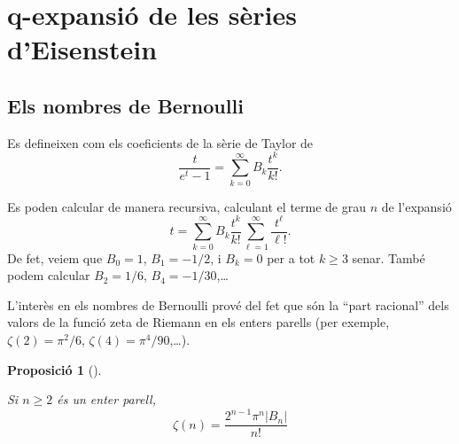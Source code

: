\documentclass[
  letterpaper,
  DIV=11,
  numbers=noendperiod]{scrreprt}
\theoremstyle{plain}
\theoremstyle{plain}
\theoremstyle{definition}
\theoremstyle{plain}
\newtheorem{proposition}{Proposició}[chapter]
\theoremstyle{plain}
\theoremstyle{definition}
\theoremstyle{remark}
\begin{document}
\providecommand{\lto}{\longrightarrow}
\providecommand{\dfn}{\ensuremath{:=}}
\providecommand{\surjects}{\twoheadrightarrow}
\providecommand{\injects}{\hookrightarrow}
\providecommand{\id}{\ensuremath \text{Id}}
\providecommand{\tns}[1][]{\otimes_{\!#1}}
\providecommand{\mtx}[4]{\left(\begin{matrix}#1&#2\\#3&#4\end{matrix}\right)}
\providecommand{\mat}[1]{\left(\begin{matrix}#1\end{matrix}\right)}
\providecommand{\smat}[1]{\left(\begin{smallmatrix}#1\end{smallmatrix}\right)}
\providecommand{\smtx}[4]{\left(\begin{smallmatrix}#1&#2\\#3&#4\end{smallmatrix}\right)}

\providecommand{\slz}{\operatorname{SL}_2(\bZ)}
\providecommand{\to}{\longrightarrow}
\providecommand{\dlog}{\operatorname{dlog}}

\providecommand{\slsh}[1]{|_{#1}}

\section{q-expansió de les sèries
d'Eisenstein}\label{q-expansiuxf3-de-les-suxe8ries-deisenstein}

\subsection{Els nombres de Bernoulli}\label{els-nombres-de-bernoulli}

Es defineixen com els coeficients de la sèrie de Taylor de \[
\frac{t}{e^t-1} = \sum_{k=0}^\infty B_k \frac{t^k}{k!}.
\]

Es poden calcular de manera recursiva, calculant el terme de grau \(n\)
de l'expansió \[
t = \sum_{k=0}^\infty B_k \frac{t^k}{k!} \sum_{\ell=1}^\infty \frac{t^\ell}{\ell!}.
\] De fet, veiem que \(B_0=1\), \(B_1=-1/2\), i \(B_k=0\) per a tot
\(k\geq 3\) senar. També podem calcular \(B_2=1/6\),
\(B_4=-1/30\),\ldots{}

L'interès en els nombres de Bernoulli prové del fet que són la ``part
racional'' dels valors de la funció zeta de Riemann en els enters
parells (per exemple, \(\zeta(2)=\pi^2/6\),
\(\zeta(4)=\pi^4/90\),\ldots).

\begin{proposition}[]\protect\hypertarget{prp-}{}\label{prp-}

Si \(n\geq 2\) és un enter parell, \[
\zeta(n) = \frac {2^{n-1}\pi^{n} |B_{n}|} {n!}
\]

\end{proposition}
\end{document}
